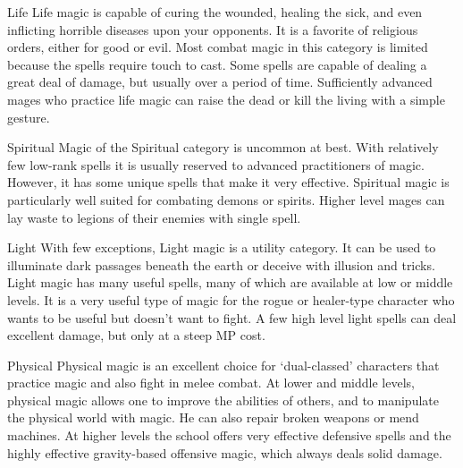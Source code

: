 \documentclass[twoside]{book}
\begin{document}
              
                  Life   Life magic is capable
                  of curing the wounded, healing the sick, and even
                  inflicting horrible diseases upon your opponents. It is
                  a favorite of religious orders, either for good or
                  evil. Most combat magic in this category is limited
                  because the spells require touch to cast. Some spells
                  are capable of dealing a great deal of damage, but
                  usually over a period of time. Sufficiently advanced
                  mages who practice life magic can raise the dead or
                  kill the living with a simple gesture.
                
              
                  Spiritual   Magic of the
                  Spiritual category is uncommon at best. With relatively
                  few low-rank spells it is usually reserved to advanced
                  practitioners of magic. However, it has some unique
                  spells that make it very effective. Spiritual magic is
                  particularly well suited for combating demons or
                  spirits. Higher level mages can lay waste to legions of
                  their enemies with single spell.
                
              
                  Light   With few exceptions,
                  Light magic is a utility category. It can be used to
                  illuminate dark passages beneath the earth or deceive
                  with illusion and tricks. Light magic has many useful
                  spells, many of which are available at low or middle
                  levels. It is a very useful type of magic for the rogue
                  or healer-type character who wants to be useful but
                  doesn't want to fight. A few high level light
                  spells can deal excellent damage, but only at a steep
                  MP cost.
                
              
                  Physical   Physical magic is
                  an excellent choice for `dual-classed'
                  characters that practice magic and also fight in melee
                  combat. At lower and middle levels, physical magic
                  allows one to improve the abilities of others, and to
                  manipulate the physical world with magic. He can also
                  repair broken weapons or mend machines. At higher
                  levels the school offers very effective defensive
                  spells and the highly effective gravity-based offensive
                  magic, which always deals solid damage.
                
\end{document}

